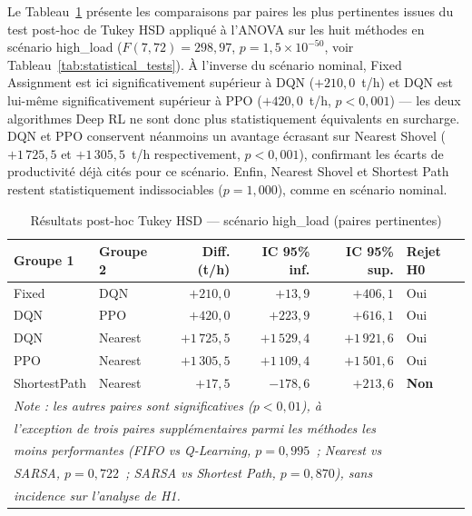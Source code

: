 \documentclass[11pt,a4paper]{report}
\begin{document}
Le Tableau~\ref{tab:tukey-highload} présente les comparaisons par paires
les plus pertinentes issues du test post-hoc de Tukey HSD appliqué à
l'ANOVA sur les huit méthodes en scénario high\_load
($F(7,72) = 298{,}97$, $p = 1{,}5 \times 10^{-50}$, voir Tableau~\ref{tab:statistical_tests}).
À l'inverse du scénario nominal, Fixed Assignment est ici
significativement supérieur à DQN ($+210{,}0$~t/h) et DQN est lui-même
significativement supérieur à PPO ($+420{,}0$~t/h, $p < 0{,}001$) --- les
deux algorithmes Deep RL ne sont donc plus statistiquement équivalents
en surcharge. DQN et PPO conservent néanmoins un avantage écrasant sur
Nearest Shovel ($+1\,725{,}5$ et $+1\,305{,}5$~t/h respectivement,
$p < 0{,}001$), confirmant les écarts de productivité déjà cités pour
ce scénario. Enfin, Nearest Shovel et Shortest Path restent
statistiquement indissociables ($p = 1{,}000$), comme en scénario
nominal.

\begin{table}[H]
\centering
\caption{Résultats post-hoc Tukey HSD — scénario high\_load (paires pertinentes)}
\label{tab:tukey-highload}
\small
\begin{tabular}{llrrrl}
\toprule
\textbf{Groupe 1} & \textbf{Groupe 2} & \textbf{Diff. (t/h)} & \textbf{IC 95\% inf.} & \textbf{IC 95\% sup.} & \textbf{Rejet H0} \\
\midrule
Fixed & DQN          & $+210{,}0$    & $+13{,}9$    & $+406{,}1$   & Oui \\
DQN   & PPO          & $+420{,}0$    & $+223{,}9$   & $+616{,}1$   & Oui \\
DQN   & Nearest      & $+1\,725{,}5$ & $+1\,529{,}4$ & $+1\,921{,}6$ & Oui \\
PPO   & Nearest      & $+1\,305{,}5$ & $+1\,109{,}4$ & $+1\,501{,}6$ & Oui \\
ShortestPath & Nearest & $+17{,}5$   & $-178{,}6$   & $+213{,}6$   & \textbf{Non} \\
\midrule
\multicolumn{6}{l}{\textit{Note : les autres paires sont significatives ($p < 0{,}01$), à}} \\
\multicolumn{6}{l}{\textit{l'exception de trois paires supplémentaires parmi les méthodes les}} \\
\multicolumn{6}{l}{\textit{moins performantes (FIFO vs Q-Learning, $p = 0{,}995$~; Nearest vs}} \\
\multicolumn{6}{l}{\textit{SARSA, $p = 0{,}722$~; SARSA vs Shortest Path, $p = 0{,}870$), sans}} \\
\multicolumn{6}{l}{\textit{incidence sur l'analyse de H1.}} \\
\bottomrule
\end{tabular}
\end{table}
\end{document}
